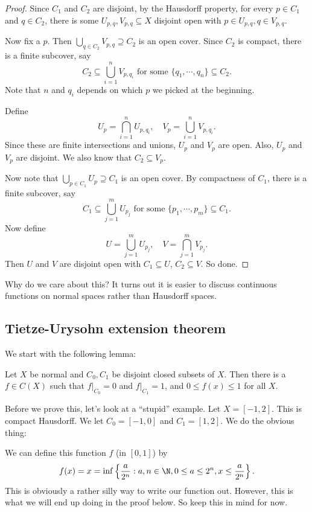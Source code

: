 \documentclass[a4paper]{article}
\begin{document}
\begin{proof}
  Since $C_1$ and $C_2$ are disjoint, by the Hausdorff property, for every $p \in C_1$ and $q \in C_2$, there is some $U_{p, q}, V_{p, q}\subseteq X$ disjoint open with $p \in U_{p, q}, q \in V_{p, q}$.

  Now fix a $p$. Then $\bigcup_{q \in C_2}V_{p, q}\supseteq C_2$ is an open cover. Since $C_2$ is compact, there is a finite subcover, say
  \[
    C_2 \subseteq \bigcup_{i = 1}^n V_{p, q_i}\text{ for some }\{q_1,\cdots, q_n\}\subseteq C_2.
  \]
  Note that $n$ and $q_i$ depends on which $p$ we picked at the beginning.

  Define
  \[
    U_p = \bigcap_{i=1}^n  U_{p, q_i},\quad V_p = \bigcup_{i = 1}^n V_{p, q_i}.
  \]
  Since these are finite intersections and unions, $U_p$ and $V_p$ are open. Also, $U_p$ and $V_p$ are disjoint. We also know that $C_2 \subseteq V_p$.

  Now note that $\bigcup_{p \in C_1} U_p \supseteq C_1$ is an open cover. By compactness of $C_1$, there is a finite subcover, say
  \[
    C_1 \subseteq \bigcup_{j = 1}^m U_{p_j}\text{ for some }\{p_1, \cdots, p_m\}\subseteq C_1.
  \]
  Now define
  \[
    U = \bigcup_{j = 1}^m U_{p_j},\quad V = \bigcap_{j = 1}^m V_{p_j}.
  \]
  Then $U$ and $V$ are disjoint open with $C_1 \subseteq U$, $C_2 \subseteq V$. So done.
\end{proof}
Why do we care about this? It turns out it is easier to discuss continuous functions on normal spaces rather than Hausdorff spaces.

\subsection{Tietze-Urysohn extension theorem}
We start with the following lemma:
\begin{lemma}
  Let $X$ be normal and $C_0, C_1$ be disjoint closed subsets of $X$. Then there is a $f \in C(X)$ such that $f|_{C_0} = 0$ and $f|_{C_1} = 1$, and $0 \leq f(x) \leq 1$ for all $X$.
\end{lemma}
Before we prove this, let's look at a ``stupid'' example. Let $X = [-1, 2]$. This is compact Hausdorff. We let $C_0 = [-1, 0]$ and $C_1 = [1, 2]$. We do the obvious thing:
\begin{center}
\end{center}
We can define this function $f$ (in $[0, 1]$) by
\[
  f(x) = x = \inf\left\{\frac{a}{2^n}: a, n \in \N, 0 \leq a \leq 2^n, x \leq \frac{a}{2^n}\right\}.
\]
This is obviously a rather silly way to write our function out. However, this is what we will end up doing in the proof below. So keep this in mind for now.
\end{document}
